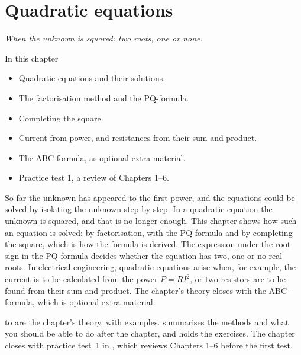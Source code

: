 
\chapter{Quadratic equations}
\label{c6:ch}

{\large\itshape When the unknown is squared: two roots, one or none.\par}

\begin{chapterbox}{In this chapter}
\begin{itemize}
  \item Quadratic equations and their solutions.
  \item The factorisation method and the PQ-formula.
  \item Completing the square.
  \item Current from power, and resistances from their sum and product.
  \item The ABC-formula, as optional extra material.
  \item Practice test 1, a review of Chapters 1--6.
\end{itemize}
\end{chapterbox}

So far the unknown has appeared to the first power, and the equations could be solved by isolating
the unknown step by step. In a quadratic equation the unknown is squared, and that is no longer
enough. This chapter shows how such an equation is solved: by factorisation, with the PQ-formula
and by completing the square, which is how the formula is derived. The expression under the root
sign in the PQ-formula decides whether the equation has two, one or no real roots. In electrical
engineering, quadratic equations arise when, for example, the current is to be calculated from the
power $P = RI^2$, or two resistors are to be found from their sum and product. The chapter's theory
closes with the ABC-formula, which is optional extra material.

 to  are the chapter's theory, with
examples.  summarises the methods and what you should be able to do
after the chapter, and  holds the exercises. The chapter closes with
practice test~1 in , which reviews Chapters 1--6 before the first
test.





